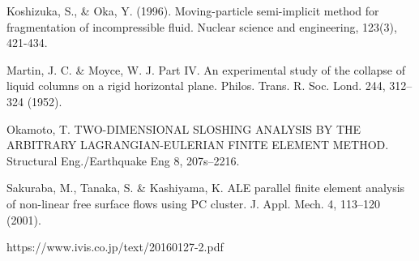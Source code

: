 \documentclass[8pt,a4paper]{article}
\begin{document}
\begin{thebibliography}{99}
	 Koshizuka, S., \& Oka, Y. (1996). Moving-particle semi-implicit method for fragmentation of incompressible fluid. Nuclear science and engineering, 123(3), 421-434.

	 Martin, J. C. \& Moyce, W. J. Part IV. An experimental study of the collapse of liquid columns on a rigid horizontal plane. Philos. Trans. R. Soc. Lond. 244, 312–324 (1952).


	 Okamoto, T. TWO-DIMENSIONAL SLOSHING ANALYSIS BY THE ARBITRARY LAGRANGIAN-EULERIAN FINITE ELEMENT METHOD. Structural Eng./Earthquake Eng 8, 207s–2216.

	 Sakuraba, M., Tanaka, S. \& Kashiyama, K. ALE parallel finite element analysis of non-linear free surface flows using PC cluster. J. Appl. Mech. 4, 113–120 (2001).

	 https://www.ivis.co.jp/text/20160127-2.pdf
  
\end{thebibliography}
\end{document}
